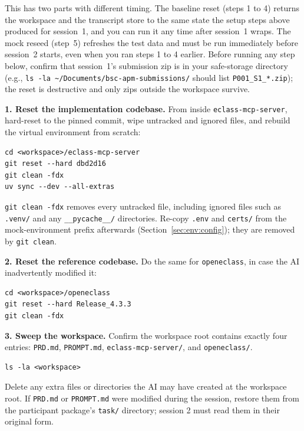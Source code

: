 \documentclass[11pt, a4paper]{article}
\begin{document}
This has two parts with different timing. The baseline reset (steps 1 to 4) returns the workspace and the transcript store to the same state the setup steps above produced for session~1, and you can run it any time after session~1 wraps. The mock reseed (step~5) refreshes the test data and must be run immediately before session~2 starts, even when you ran steps 1 to 4 earlier. Before running any step below, confirm that session~1's submission zip is in your safe-storage directory (e.g., \texttt{ls -la \textasciitilde/Documents/bsc-apm-submissions/} should list \texttt{P001\_S1\_*.zip}); the reset is destructive and only zips outside the workspace survive.

\textbf{1. Reset the implementation codebase.} From inside \texttt{eclass-mcp-server}, hard-reset to the pinned commit, wipe untracked and ignored files, and rebuild the virtual environment from scratch:

\begin{verbatim}
cd <workspace>/eclass-mcp-server
git reset --hard dbd2d16
git clean -fdx
uv sync --dev --all-extras
\end{verbatim}

\texttt{git clean -fdx} removes every untracked file, including ignored files such as \texttt{.venv/} and any \texttt{\_\_pycache\_\_/} directories. Re-copy \texttt{.env} and \texttt{certs/} from the mock-environment prefix afterwards (Section~\ref{sec:env:config}); they are removed by \texttt{git clean}.

\textbf{2. Reset the reference codebase.} Do the same for \texttt{openeclass}, in case the AI inadvertently modified it:

\begin{verbatim}
cd <workspace>/openeclass
git reset --hard Release_4.3.3
git clean -fdx
\end{verbatim}

\textbf{3. Sweep the workspace.} Confirm the workspace root contains exactly four entries: \texttt{PRD.md}, \texttt{PROMPT.md}, \texttt{eclass-mcp-server/}, and \texttt{openeclass/}.

\begin{verbatim}
ls -la <workspace>
\end{verbatim}

Delete any extra files or directories the AI may have created at the workspace root. If \texttt{PRD.md} or \texttt{PROMPT.md} were modified during the session, restore them from the participant package's \texttt{task/} directory; session 2 must read them in their original form.
\end{document}
